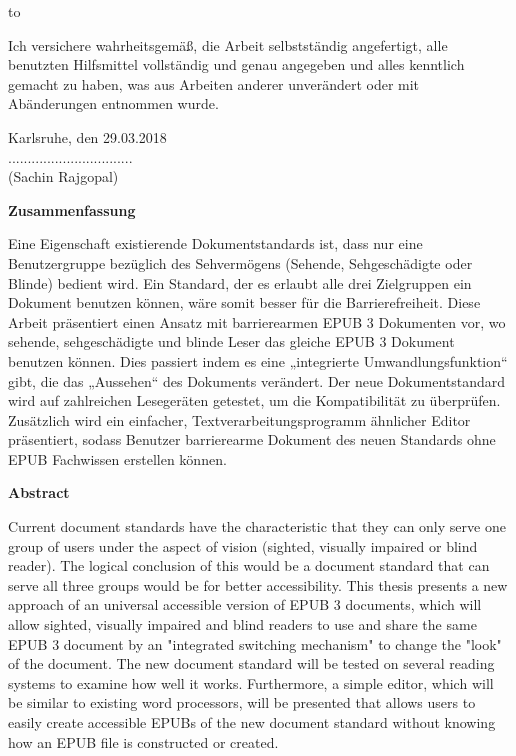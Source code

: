 \thispagestyle{empty}
\vspace*{36\baselineskip}
\hbox to \textwidth{\hrulefill}
\par
Ich versichere wahrheitsgemäß, die Arbeit selbstständig angefertigt, alle benutzten Hilfsmittel vollständig und genau angegeben und alles kenntlich gemacht zu haben, was aus Arbeiten anderer unverändert oder mit Abänderungen entnommen wurde.

Karlsruhe, den 29.03.2018 %
\vspace*{2\baselineskip}
\\

................................ \\
(Sachin Rajgopal)
\cleardoublepage

\vspace*{1em}
\begin{center}
	\textbf{Zusammenfassung}
\end{center}
\par
Eine Eigenschaft existierende Dokumentstandards ist, dass nur eine Benutzergruppe bezüglich des Sehvermögens (Sehende, Sehgeschädigte oder Blinde) bedient wird. Ein Standard, der es erlaubt alle drei Zielgruppen ein Dokument benutzen können, wäre somit besser für die Barrierefreiheit. 
Diese Arbeit präsentiert einen Ansatz mit barrierearmen EPUB 3 Dokumenten vor, wo sehende, sehgeschädigte und blinde Leser das gleiche EPUB 3 Dokument benutzen können. Dies passiert indem es eine „integrierte Umwandlungsfunktion“ gibt, die das „Aussehen“ des Dokuments verändert. Der neue Dokumentstandard wird auf zahlreichen Lesegeräten getestet, um die Kompatibilität zu überprüfen. Zusätzlich wird ein einfacher, Textverarbeitungsprogramm ähnlicher Editor präsentiert, sodass Benutzer barrierearme Dokument des neuen Standards ohne EPUB Fachwissen erstellen können. 


\cleardoublepage
\vspace*{1em}
\begin{center}
	\textbf{Abstract}
\end{center}
\par
Current document standards have the characteristic that they can only serve one group of users under the aspect of vision (sighted, visually impaired or blind reader). The logical conclusion of this would be a document standard that can serve all three groups would be for better accessibility.
This thesis presents a new approach of an universal accessible version of EPUB 3 documents, which will allow sighted, visually impaired and blind readers to use and share the same EPUB 3 document by an "integrated switching mechanism" to change the "look" of the document. The new document standard will be tested on several reading systems to examine how well it works. Furthermore, a simple editor, which will be similar to existing word processors, will be presented that allows users to easily create accessible EPUBs of the new document standard without knowing how an EPUB file is constructed or created. 


\cleardoublepage

